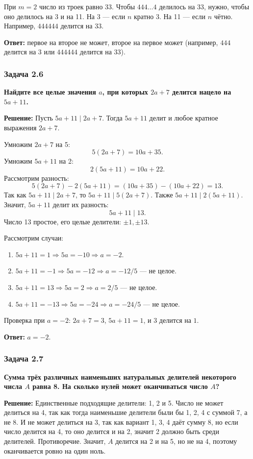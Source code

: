 \documentclass[12pt, a4paper]{article}
\begin{document}
При $m=2$ число из троек равно 33. Чтобы $444\ldots4$ делилось на 33, нужно, чтобы оно делилось на 3 и на 11. На 3 — если $n$ кратно 3. На 11 — если $n$ чётно. Например, $444444$ делится на $33$.

\textbf{Ответ:} первое на второе не может, второе на первое может (например, $444$ делится на $3$ или $444444$ делится на $33$).

\subsubsection*{Задача 2.6}
\textbf{Найдите все целые значения $a$, при которых $2a+7$ делится нацело на $5a+11$.}

\textbf{Решение:}
Пусть $5a+11 \mid 2a+7$. Тогда $5a+11$ делит и любое кратное выражения $2a+7$.

Умножим $2a+7$ на 5:
\[
5(2a+7) = 10a + 35.
\]
Умножим $5a+11$ на 2:
\[
2(5a+11) = 10a + 22.
\]
Рассмотрим разность:
\[
5(2a+7) - 2(5a+11) = (10a+35) - (10a+22) = 13.
\]
Так как $5a+11 \mid 2a+7$, то $5a+11 \mid 5(2a+7)$. Также $5a+11 \mid 2(5a+11)$. Значит, $5a+11$ делит их разность:
\[
5a+11 \mid 13.
\]
Число 13 простое, его целые делители: $\pm 1, \pm 13$.

Рассмотрим случаи:
\begin{enumerate}
    \item $5a+11 = 1 \Rightarrow 5a = -10 \Rightarrow a = -2$.
    \item $5a+11 = -1 \Rightarrow 5a = -12 \Rightarrow a = -12/5$ — не целое.
    \item $5a+11 = 13 \Rightarrow 5a = 2 \Rightarrow a = 2/5$ — не целое.
    \item $5a+11 = -13 \Rightarrow 5a = -24 \Rightarrow a = -24/5$ — не целое.
\end{enumerate}

Проверка при $a = -2$: $2a+7 = 3$, $5a+11 = 1$, и $3$ делится на $1$.

\textbf{Ответ:} $a = -2$.

\subsubsection*{Задача 2.7}
\textbf{Сумма трёх различных наименьших натуральных делителей некоторого числа $A$ равна 8. На сколько нулей может оканчиваться число $A$?}

\textbf{Решение:}
Единственные подходящие делители: 1, 2 и 5. Число не может делиться на 4, так как тогда наименьшие делители были бы 1, 2, 4 с суммой 7, а не 8. И не может делиться на 3, так как вариант 1, 3, 4 даёт сумму 8, но если число делится на 4, то оно делится и на 2, значит 2 должно быть среди делителей. Противоречие. Значит, $A$ делится на 2 и на 5, но не на 4, поэтому оканчивается ровно на один ноль.
\end{document}
